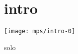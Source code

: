 \documentclass[11pt]{article}
\begin{document}
    
    \makesongtitle
    \section*{intro}
    \texttt{[image: mps/intro-0]}
    

%    
    {solo}

%    
\end{document}
